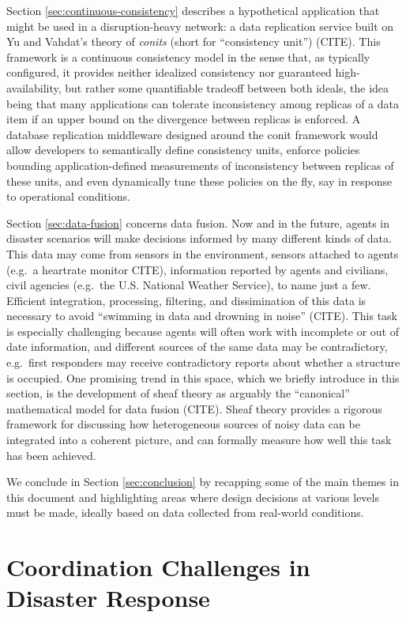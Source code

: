 \documentclass[]             %
{NASA}                       %
\theoremstyle{definition}
\begin{document}
Section \ref{sec:continuous-consistency} describes a hypothetical
application that might be used in a disruption-heavy network: a data
replication service built on Yu and Vahdat's theory of \emph{conits}
(short for ``consistency unit'') (CITE). This framework is a continuous
consistency model in the sense that, as typically configured, it
provides neither idealized consistency nor guaranteed high-availability,
but rather some quantifiable tradeoff between both ideals, the idea
being that many applications can tolerate inconsistency among replicas
of a data item if an upper bound on the divergence between replicas is
enforced. A database replication middleware designed around the conit
framework would allow developers to semantically define consistency
units, enforce policies bounding application-defined measurements of
inconsistency between replicas of these units, and even dynamically tune
these policies on the fly, say in response to operational conditions.

Section \ref{sec:data-fusion} concerns data fusion. Now and in the
future, agents in disaster scenarios will make decisions informed by
many different kinds of data. This data may come from sensors in the
environment, sensors attached to agents (e.g.~a heartrate monitor CITE),
information reported by agents and civilians, civil agencies (e.g.~the
U.S. National Weather Service), to name just a few. Efficient
integration, processing, filtering, and dissimination of this data is
necessary to avoid ``swimming in data and drowning in noise'' (CITE).
This task is especially challenging because agents will often work with
incomplete or out of date information, and different sources of the same
data may be contradictory, e.g.~first responders may receive
contradictory reports about whether a structure is occupied. One
promising trend in this space, which we briefly introduce in this
section, is the development of sheaf theory as arguably the
``canonical'' mathematical model for data fusion (CITE). Sheaf theory
provides a rigorous framework for discussing how heterogeneous sources
of noisy data can be integrated into a coherent picture, and can
formally measure how well this task has been achieved.

We conclude in Section \ref{sec:conclusion} by recapping some of the
main themes in this document and highlighting areas where design
decisions at various levels must be made, ideally based on data
collected from real-world conditions.

\newpage

\section{Coordination Challenges in Disaster
Response}\label{coordination-challenges-in-disaster-response}
\end{document}

